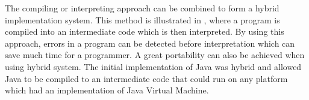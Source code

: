 \begin{figure}
	\begin{center}
		\end{center}
	\label{fig:compileroverviewinterpretation}
\end{figure}

The compiling or interpreting approach can be combined to form a hybrid implementation system. This method is illustrated in , where a program is compiled into an intermediate code which is then interpreted. By using this approach, errors in a program can be detected before interpretation which can save much time for a programmer. A great portability can also be achieved when using hybrid system. The initial implementation of Java was hybrid and allowed Java to be compiled to an intermediate code that could run on any platform which had an implementation of Java Virtual Machine\cite[p. 50]{sebesta2013}. 

